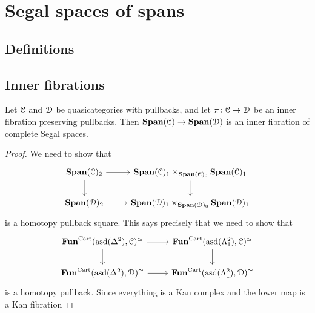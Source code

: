 \documentclass[main.tex]{subfiles}
\begin{document}
\section{Segal spaces of spans}
\label{sec:segal_spaces_of_spans}


\subsection{Definitions}
\label{ssc:definitions}

\subsection{Inner fibrations}
\label{ssc:inner_fibrations}

\begin{theorem}
  Let $\mathcal{C}$ and $\mathcal{D}$ be quasicategories with pullbacks, and let $\pi\colon \mathcal{C} \to \mathcal{D}$ be an inner fibration preserving pullbacks. Then $\mathbf{Span}(\mathcal{C}) \to \mathbf{Span}(\mathcal{D})$ is an inner fibration of complete Segal spaces.
\end{theorem}
\begin{proof}
  We need to show that
  \begin{equation*}
    \begin{tikzcd}
      \Span(\category{C})_{2}
      \arrow[r]
      \arrow[d]
      & \Span(\category{C})_{1} \times_{\Span(\category{C})_{0}} \Span(\category{C})_{1}
      \arrow[d]
      \\
      \Span(\category{D})_{2}
      \arrow[r]
      & \Span(\category{D})_{1} \times_{\Span(\category{D})_{0}} \Span(\category{D})_{1}
    \end{tikzcd}
  \end{equation*}
  is a homotopy pullback square. This says precisely that we need to show that
  \begin{equation*}
    \begin{tikzcd}
      \Fun^{\Cart}(\asd(\Delta^{2}), \category{C})^{\simeq}
      \arrow[r]
      \arrow[d]
      & \Fun^{\Cart}(\asd(\Lambda^{2}_{1}), \category{C})^{\simeq}
      \arrow[d]
      \\
      \Fun^{\Cart}(\asd(\Delta^{2}), \category{D})^{\simeq}
      \arrow[r]
      & \Fun^{\Cart}(\asd(\Lambda^{2}_{1}), \category{D})^{\simeq}
    \end{tikzcd}
  \end{equation*}
  is a homotopy pullback. Since everything is a Kan complex and the lower map is a Kan fibration
\end{proof}
\end{document}
